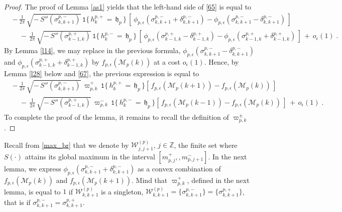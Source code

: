 \documentclass[reqno]{amsart}
\theoremstyle{plain}
\theoremstyle{definition}
\newcommand{\mf}[1]{{\mathfrak #1}}
\newcommand{\bb}[1]{{\mathbb #1}}
\newcommand{\ms}[1]{{\mathscr #1}}
\newcommand{\mtt}[1]{{\mathtt #1}}
\newcounter{as}[section]
\newcommand{\<}{\langle}
\renewcommand{\>}{\rangle}
\begin{document}
\begin{proof}
The proof of Lemma \ref{as1} yields that the left-hand side of
\eqref{65} is equal to
\begin{equation}
\label{66}
\begin{aligned}
& -\, \frac{1}{2\pi} \, 
\sqrt{-\, S''(\sigma^{p,-}_{k,k+1})}
\, \mtt 1\{\, h^{p,+}_{k} \,=\,  \mf h_{p} \,\}
\, [\, \phi_{p,\epsilon}(\sigma^{p,-}_{k,k+1}
+ \delta^{p,-}_{k,k+1}) - \phi_{p,\epsilon}(\sigma^{p,-}_{k,k+1}
- \delta^{p,-}_{k,k+1})\,]
\\
&\quad
-\, \frac{1}{2\pi} \, 
\sqrt{-\, S''(\sigma^{p,+}_{k-1,k})}
\, \mtt 1\{\, h^{p,-}_{k} \,=\,  \mf h_{p} \,\}
\, [\, \phi_{p,\epsilon}(\sigma^{p,+}_{k-1,k}
- \delta^{p,+}_{k-1,k}) - \phi_{p,\epsilon}(\sigma^{p,+}_{k-1,k}
+ \delta^{p,+}_{k-1,k})\,]
\,+\, o_\epsilon(1)\;.
\end{aligned}
\end{equation}
By Lemma \ref{l14}, we may replace in the previous formula,
$\phi_{p,\epsilon}(\sigma^{p,-}_{k,k+1} - \delta^{p,-}_{k,k+1})$ and
$\phi_{p,\epsilon}(\sigma^{p,+}_{k-1,k} + \delta^{p,+}_{k-1,k})$ by
$f_{p,\epsilon} (\ms M_p(k))$ at a cost $o_\epsilon(1)$. Hence, by Lemma
\ref{l28} below and \eqref{67}, the previous expression is equal to
\begin{equation*}
\begin{aligned}
& -\, \frac{1}{2\pi} \, 
\sqrt{-\, S''(\sigma^{p,-}_{k,k+1} )}
\, \varpi^{+}_{p,k} \,
\mtt 1\{\, h^{p,+}_{k} \,=\,  \mf h_{p} \,\}
[\,  f_{p,\epsilon} (\ms M_p(k+1))   -  f_{p,\epsilon} (\ms M_p(k)) \,]
\\
&\quad
-\, \frac{1}{2\pi} \, 
\sqrt{-\, S''(\sigma^{p,+}_{k-1,k}) }
\, \varpi^{-}_{p,k} 
\, \mtt 1\{\, h^{p,-}_{k} \,=\,  \mf h_{p} \,\}
[\, f_{p,\epsilon} (\ms M_p(k-1))   - f_{p,\epsilon} (\ms M_p(k)) \,]
\,+\, o_\epsilon(1)\;.
\end{aligned}
\end{equation*}
To complete the proof of the lemma, it remains to recall the
definition of $\varpi^{\pm}_{p,k} $.
\end{proof}

Recall from \eqref{max_br} that we denote by $\ms W^{(p)}_{j,j+1}$,
$j\in \bb Z$, the finite set where $S(\cdot)$ attains its global
maximum in the interval $[m^+_{p,j} ,, m^-_{p,j+1}]$.  In the next
lemma, we express
$\phi_{p,\epsilon}(\sigma^{p,-}_{k,k+1} + \delta^{p,-}_{k,k+1})$ as a convex
combination of $f_{p,\epsilon} (\ms M_p(k))$ and
$f_{p,\epsilon} (\ms M_p(k+1))$.  Mind that $\varpi^{+}_{p,k}$,
defined in the next lemma, is equal to $1$ if $\ms W^{(p)}_{k,k+1}$ is
a singleton,
$\ms W^{(p)}_{k,k+1} = \{\sigma^{p,-}_{k,k+1} \} =
\{\sigma^{p,+}_{k,k+1} \}$, that is if
$\sigma^{p,-}_{k,k+1} = \sigma^{p,+}_{k,k+1}$.
\end{document}

